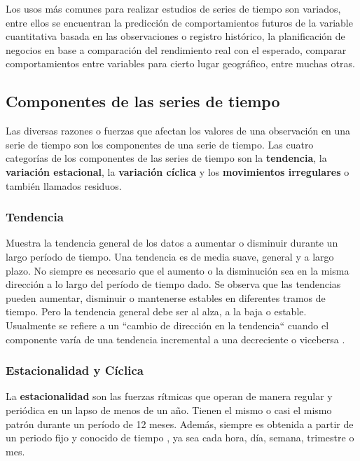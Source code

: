 Los usos más comunes para realizar estudios de series de tiempo son variados, entre ellos se encuentran la predicción de comportamientos
futuros de la variable cuantitativa basada en las observaciones o registro histórico, la planificación de negocios en base a comparación del 
rendimiento real con el esperado, comparar comportamientos entre variables para cierto lugar geográfico, entre muchas otras. 


    \subsection{Componentes de las series de tiempo}
    
    Las diversas razones o fuerzas que afectan los valores de una observación en una serie de tiempo son los componentes de una serie de tiempo. 
    Las cuatro categorías de los componentes de las series de tiempo son la \textbf{tendencia}, la \textbf{variación estacional}, la \textbf{variación cíclica} 
    y los \textbf{movimientos irregulares} o también llamados residuos.

    \subsubsection{Tendencia}
    Muestra la tendencia general de los datos a aumentar o disminuir durante un largo período de tiempo. Una tendencia es de media suave, general y 
    a largo plazo. No siempre es necesario que el aumento o la disminución sea en la misma dirección a lo largo del período de tiempo dado.
    Se observa que las tendencias pueden aumentar, disminuir o mantenerse estables en diferentes tramos de tiempo. Pero la tendencia general debe ser al alza, a la baja o estable. 
    Usualmente se refiere a un ``cambio de dirección en la tendencia`` cuando el componente varía de una tendencia incremental a una decreciente o vicebersa \cite{20}.

    \subsubsection{Estacionalidad y Cíclica}
    
    La \textbf{estacionalidad} son las fuerzas rítmicas que operan de manera regular y periódica en un lapso de menos de un año. Tienen el mismo o casi el mismo patrón durante un período de 12 meses. 
    Además, siempre es obtenida a partir de un periodo fijo y conocido de tiempo \cite{20}, ya sea cada hora, día, semana, trimestre o mes.
    
